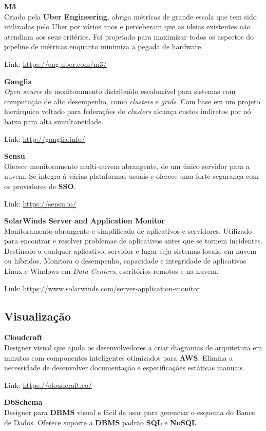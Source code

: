 \documentclass[fleqn,10pt]{../sty/SelfArx} %
\begin{document}
\textbf{M3} \\
Criado pela \textbf{Uber Engineering}, abriga métricas de grande escala que tem sido utilizadas pelo Uber por vários anos e perceberam que as ideias existentes não atendiam aos seus critérios. Foi projetado para maximizar todos os aspectos do pipeline de métricas enquanto minimiza a pegada de hardware.

Link: \url{https://eng.uber.com/m3/}

\textbf{Ganglia} \\
\textit{Open source} de monitoramento distribuído escalonável para sistemas com computação de alto desempenho, como \textit{clusters} e \textit{grids}. Com base em um projeto hierárquico voltado para federações de \textit{clusters} alcança custos indiretos por nó baixo para alta simultaneidade.

Link: \url{http://ganglia.info/}

\textbf{Sensu} \\
Oferece monitoramento multi-nuvem abrangente, de um único servidor para a nuvem. Se integra à várias plataformas usuais e oferece uma forte segurança com os provedores de \textbf{SSO}.

Link: \url{https://sensu.io/}

\textbf{SolarWinds Server and Application Monitor} \\
Monitoramento abrangente e simplificado de aplicativos e servidores. Utilizado para encontrar e resolver problemas de aplicativos antes que se tornem incidentes. Destinado a qualquer aplicativo, servidor e lugar seja sistemas locais, em nuvem ou híbridos. Monitora o desempenho, capacidade e integridade de aplicativos Linux e Windows em \textit{Data Centers}, escritórios remotos e na nuvem.

Link: \url{https://www.solarwinds.com/server-application-monitor}

\subsection*{Visualização}

\textbf{Cloudcraft} \\
Designer visual que ajuda os desenvolvedores a criar diagramas de arquitetura em minutos com componentes inteligentes otimizados para \textbf{AWS}. Elimina a necessidade de desenvolver documentação e especificações estáticas manuais.

Link: \url{https://cloudcraft.co/}

\textbf{DbSchema} \\
Designer para \textbf{DBMS} visual e fácil de usar para gerenciar o esquema do Banco de Dados. Oferece suporte a \textbf{DBMS} padrão \textbf{SQL} e \textbf{NoSQL}
\end{document}
